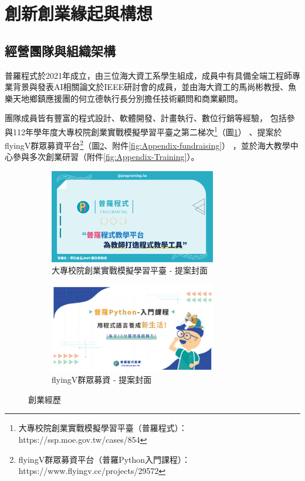 \section{創新創業緣起與構想}
\subsection{經營團隊與組織架構}

普羅程式於2021年成立，由三位海大資工系學生組成，成員中有具備全端工程師專業背景與發表AI相關論文於IEEE研討會的成員，並由海大資工的馬尚彬教授、魚樂天地鄉鎮應援團的何立德執行長分別擔任技術顧問和商業顧問。

團隊成員皆有豐富的程式設計、軟體開發、計畫執行、數位行銷等經驗，
包括參與112年學年度大專校院創業實戰模擬學習平臺之第二梯次\footnote{大專校院創業實戰模擬學習平臺（普羅程式）：https://ssp.moe.gov.tw/cases/854}（圖\ref{fig:experience-1}）
、提案於flyingV群眾募資平台\footnote{flyingV群眾募資平台（普羅Python入門課程）：https://www.flyingv.cc/projects/29572}（圖\ref{fig:experience-2}、附件\ref{fig:Appendix-fundraising}）
，並於海大教學中心參與多次創業研習（附件\ref{fig:Appendix-Training}）。

\begin{figure}[H]
  \centering
  \begin{subfigure}{0.45\linewidth}
    \centering
    \includegraphics[width=0.8\textwidth]{images/maker.png}
    \caption{大專校院創業實戰模擬學習平臺 - 提案封面}
    \label{fig:experience-1}
  \end{subfigure}
    \begin{subfigure}{0.45\linewidth}
    \centering
    \includegraphics[width=0.8\textwidth]{images/flyingv.jpg}
    \caption{flyingV群眾募資 - 提案封面}
    \label{fig:experience-2}
  \end{subfigure}
  \caption{創業經歷}
  \label{fig:Experience}
\end{figure}

